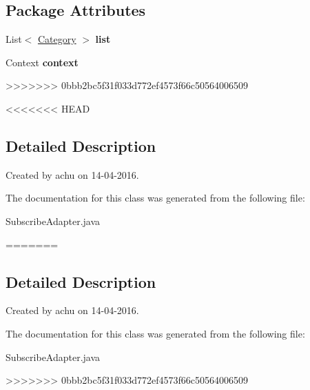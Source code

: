\subsection*{\-Package \-Attributes}
\begin{DoxyCompactItemize}
\item 
\hypertarget{classcom_1_1example_1_1sel_1_1lostfound_1_1SubscribeAdapter_a9f604b1a005e9cc04e54497d9e58054f}{\-List$<$ \hyperlink{classcom_1_1example_1_1sel_1_1lostfound_1_1Category}{\-Category} $>$ {\bfseries list}}\label{classcom_1_1example_1_1sel_1_1lostfound_1_1SubscribeAdapter_a9f604b1a005e9cc04e54497d9e58054f}

\item 
\hypertarget{classcom_1_1example_1_1sel_1_1lostfound_1_1SubscribeAdapter_a98b58d40ae29eb5f31f868e0ac3e7709}{\-Context {\bfseries context}}\label{classcom_1_1example_1_1sel_1_1lostfound_1_1SubscribeAdapter_a98b58d40ae29eb5f31f868e0ac3e7709}
>>>>>>> 0bbb2bc5f31f033d772ef4573f66c50564006509

\end{DoxyCompactItemize}


<<<<<<< HEAD
\subsection{Detailed Description}
Created by achu on 14-\/04-\/2016. 

The documentation for this class was generated from the following file\-:\begin{DoxyCompactItemize}
\item 
Subscribe\-Adapter.\-java\end{DoxyCompactItemize}
=======
\subsection{\-Detailed \-Description}
\-Created by achu on 14-\/04-\/2016. 

\-The documentation for this class was generated from the following file\-:\begin{DoxyCompactItemize}
\item 
\-Subscribe\-Adapter.\-java\end{DoxyCompactItemize}
>>>>>>> 0bbb2bc5f31f033d772ef4573f66c50564006509
